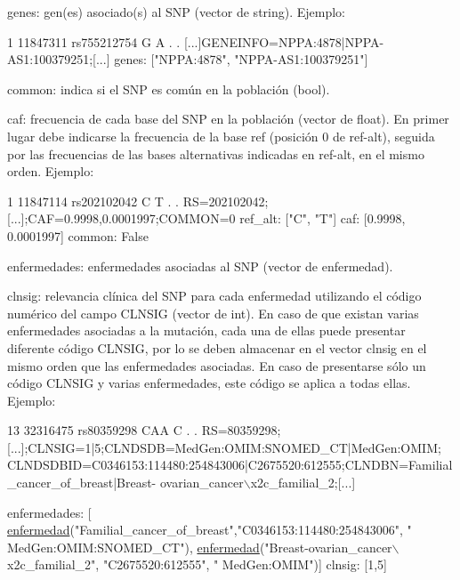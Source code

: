 \begin{DoxyItemize}
\item genes\+: gen(es) asociado(s) al S\+NP (vector de string). Ejemplo\+: 
\begin{DoxyCode}
1 11847311  rs755212754 G A . . [...]GENEINFO=NPPA:4878|NPPA-AS1:100379251;[...]
genes: [\textcolor{stringliteral}{"NPPA:4878"}, \textcolor{stringliteral}{"NPPA-AS1:100379251"}]
\end{DoxyCode}
 \item common\+: indica si el S\+NP es común en la población (bool). \item caf\+: frecuencia de cada base del S\+NP en la población (vector de float). En primer lugar debe indicarse la frecuencia de la base \textquotesingle{}ref\textquotesingle{} (posición 0 de ref-\/alt), seguida por las frecuencias de las bases alternativas indicadas en \textquotesingle{}ref-\/alt\textquotesingle{}, en el mismo orden. Ejemplo\+: 
\begin{DoxyCode}
1 11847114  rs202102042 C T . . RS=202102042;[...];CAF=0.9998,0.0001997;COMMON=0
ref\_alt: [\textcolor{stringliteral}{"C"}, \textcolor{stringliteral}{"T"}]
caf: [0.9998, 0.0001997]
common: False
\end{DoxyCode}
 \item enfermedades\+: enfermedades asociadas al S\+NP (vector de enfermedad). \item clnsig\+: relevancia clínica del S\+NP para cada enfermedad utilizando el código numérico del campo C\+L\+N\+S\+IG (vector de int). En caso de que existan varias enfermedades asociadas a la mutación, cada una de ellas puede presentar diferente código C\+L\+N\+S\+IG, por lo se deben almacenar en el vector clnsig en el mismo orden que las enfermedades asociadas. En caso de presentarse sólo un código C\+L\+N\+S\+IG y varias enfermedades, este código se aplica a todas ellas. Ejemplo\+: 
\begin{DoxyCode}
13  32316475  rs80359298  CAA C . . RS=80359298;[...];CLNSIG=1|5;CLNDSDB=MedGen:OMIM:SNOMED\_CT|MedGen:OMIM;
      CLNDSDBID=C0346153:114480:254843006|C2675520:612555;CLNDBN=Familial\_cancer\_of\_breast|Breast-
      ovarian\_cancer\(\backslash\)x2c\_familial\_2;[...]

enfermedades: [ \hyperlink{classenfermedad}{enfermedad}(\textcolor{stringliteral}{"Familial\_cancer\_of\_breast"},\textcolor{stringliteral}{"C0346153:114480:254843006"}, \textcolor{stringliteral}{"
      MedGen:OMIM:SNOMED\_CT"}), 
                \hyperlink{classenfermedad}{enfermedad}(\textcolor{stringliteral}{"Breast-ovarian\_cancer\(\backslash\)x2c\_familial\_2"}, \textcolor{stringliteral}{"C2675520:612555"}, \textcolor{stringliteral}{"
      MedGen:OMIM"})]
clnsig: [1,5] 
\end{DoxyCode}
\end{DoxyItemize}

